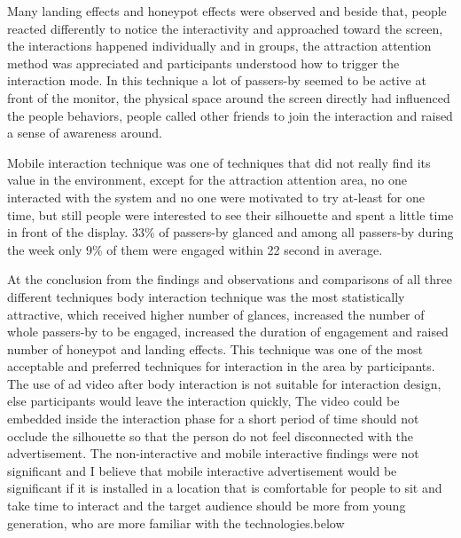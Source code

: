 Many landing effects and honeypot effects were observed and beside that, people reacted differently to notice the interactivity and approached toward the screen, the interactions happened individually and in groups, the attraction attention method was appreciated and participants understood how to trigger the interaction mode. In this technique a lot of passers-by seemed to be active at front of the monitor, the physical space around the screen directly had influenced the people behaviors, people called other friends to join the interaction and raised a sense of awareness around. 

Mobile interaction technique was one of techniques that did not really find its value in the environment, except for the attraction attention area, no one interacted with the system and no one were motivated to try at-least for one time, but still people were interested to see their silhouette and spent a little time in front of the display. 33\% of passers-by glanced and among all passers-by during the week only 9\% of them were engaged within 22 second in average.

At the conclusion from the findings and observations and comparisons of all three different techniques body interaction technique was the most statistically attractive, which received higher number of glances, increased the number of whole passers-by to be engaged, increased the duration of engagement and raised number of honeypot and landing effects. This technique was one of the most acceptable and preferred techniques for interaction in the area by participants. The use of ad video after body interaction is not suitable for interaction design, else participants would leave the interaction quickly, The video could be embedded inside the interaction phase for a short period of time should not occlude the silhouette so that the person do not feel disconnected with the advertisement. The non-interactive and mobile interactive findings were not significant and I believe that mobile interactive advertisement would be significant if it is installed in a location that is comfortable for people to sit and take time to interact and the target audience should be more from young generation, who are more familiar with the technologies.below
